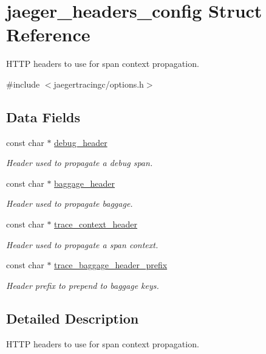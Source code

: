 \hypertarget{structjaeger__headers__config}{}\section{jaeger\+\_\+headers\+\_\+config Struct Reference}
\label{structjaeger__headers__config}


H\+T\+TP headers to use for span context propagation.  




{\ttfamily \#include $<$jaegertracingc/options.\+h$>$}

\subsection*{Data Fields}
\begin{DoxyCompactItemize}
\item 
const char $\ast$ \mbox{\hyperlink{structjaeger__headers__config_aab0510e85c8d184cdd7e1afd41f344c3}{debug\+\_\+header}}
\begin{DoxyCompactList}\small\item\em Header used to propagate a debug span. \end{DoxyCompactList}\item 
const char $\ast$ \mbox{\hyperlink{structjaeger__headers__config_ae803931b2f758163162a55b511021a1c}{baggage\+\_\+header}}
\begin{DoxyCompactList}\small\item\em Header used to propagate baggage. \end{DoxyCompactList}\item 
const char $\ast$ \mbox{\hyperlink{structjaeger__headers__config_a5aee0f70ee5455509ee2839636369a83}{trace\+\_\+context\+\_\+header}}
\begin{DoxyCompactList}\small\item\em Header used to propagate a span context. \end{DoxyCompactList}\item 
const char $\ast$ \mbox{\hyperlink{structjaeger__headers__config_aaa9702c861bf4f0c346f65bb54de0110}{trace\+\_\+baggage\+\_\+header\+\_\+prefix}}
\begin{DoxyCompactList}\small\item\em Header prefix to prepend to baggage keys. \end{DoxyCompactList}\end{DoxyCompactItemize}


\subsection{Detailed Description}
H\+T\+TP headers to use for span context propagation. 

